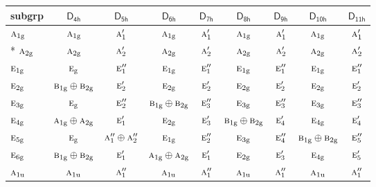 \documentclass[10pt,a4paper]{article}
\numberwithin{equation}{section}
\newcommand{\grp}[1]{\mathsf{#1}}
\newcommand{\irr}[1]{\text{\normalfont\scshape #1}}
\newcommand{\ptag}[1]{\mathrm{#1}}
\begin{document}
{\small\begin{longtable}{@{}lcccccccc@{}}\toprule
subgrp & \href{D4h.pdf}{$\grp{D_{4h}}$} & \href{D5h.pdf}{$\grp{D_{5h}}$} & \href{D6h.pdf}{$\grp{D_{6h}}$} & \href{D7h.pdf}{$\grp{D_{7h}}$} & \href{D8h.pdf}{$\grp{D_{8h}}$} & \href{D9h.pdf}{$\grp{D_{9h}}$} & \href{D10h.pdf}{$\grp{D_{10h}}$} & \href{D11h.pdf}{$\grp{D_{11h}}$}\\\midrule\endhead
\bottomrule\endfoot\endlastfoot
$\irr{a}_{1\ptag{g}}$ & $\irr{a}_{1\ptag{g}}$ & $\irr{a}_{1}'$ & $\irr{a}_{1\ptag{g}}$ & $\irr{a}_{1}'$ & $\irr{a}_{1\ptag{g}}$ & $\irr{a}_{1}'$ & $\irr{a}_{1\ptag{g}}$ & $\irr{a}_{1}'$\\*
$\irr{a}_{2\ptag{g}}$ & $\irr{a}_{2\ptag{g}}$ & $\irr{a}_{2}'$ & $\irr{a}_{2\ptag{g}}$ & $\irr{a}_{2}'$ & $\irr{a}_{2\ptag{g}}$ & $\irr{a}_{2}'$ & $\irr{a}_{2\ptag{g}}$ & $\irr{a}_{2}'$\\
$\irr{e}_{1\ptag{g}}$ & $\irr{e}_{\ptag{g}}$ & $\irr{e}_{1}''$ & $\irr{e}_{1\ptag{g}}$ & $\irr{e}_{1}''$ & $\irr{e}_{1\ptag{g}}$ & $\irr{e}_{1}''$ & $\irr{e}_{1\ptag{g}}$ & $\irr{e}_{1}''$\\
$\irr{e}_{2\ptag{g}}$ & $\irr{b}_{1\ptag{g}}\oplus \irr{b}_{2\ptag{g}}$ & $\irr{e}_{2}'$ & $\irr{e}_{2\ptag{g}}$ & $\irr{e}_{2}'$ & $\irr{e}_{2\ptag{g}}$ & $\irr{e}_{2}'$ & $\irr{e}_{2\ptag{g}}$ & $\irr{e}_{2}'$\\
$\irr{e}_{3\ptag{g}}$ & $\irr{e}_{\ptag{g}}$ & $\irr{e}_{2}''$ & $\irr{b}_{1\ptag{g}}\oplus \irr{b}_{2\ptag{g}}$ & $\irr{e}_{3}''$ & $\irr{e}_{3\ptag{g}}$ & $\irr{e}_{3}''$ & $\irr{e}_{3\ptag{g}}$ & $\irr{e}_{3}''$\\
$\irr{e}_{4\ptag{g}}$ & $\irr{a}_{1\ptag{g}}\oplus \irr{a}_{2\ptag{g}}$ & $\irr{e}_{1}'$ & $\irr{e}_{2\ptag{g}}$ & $\irr{e}_{3}'$ & $\irr{b}_{1\ptag{g}}\oplus \irr{b}_{2\ptag{g}}$ & $\irr{e}_{4}'$ & $\irr{e}_{4\ptag{g}}$ & $\irr{e}_{4}'$\\
$\irr{e}_{5\ptag{g}}$ & $\irr{e}_{\ptag{g}}$ & $\irr{a}_{1}''\oplus \irr{a}_{2}''$ & $\irr{e}_{1\ptag{g}}$ & $\irr{e}_{2}''$ & $\irr{e}_{3\ptag{g}}$ & $\irr{e}_{4}''$ & $\irr{b}_{1\ptag{g}}\oplus \irr{b}_{2\ptag{g}}$ & $\irr{e}_{5}''$\\
$\irr{e}_{6\ptag{g}}$ & $\irr{b}_{1\ptag{g}}\oplus \irr{b}_{2\ptag{g}}$ & $\irr{e}_{1}'$ & $\irr{a}_{1\ptag{g}}\oplus \irr{a}_{2\ptag{g}}$ & $\irr{e}_{1}'$ & $\irr{e}_{2\ptag{g}}$ & $\irr{e}_{3}'$ & $\irr{e}_{4\ptag{g}}$ & $\irr{e}_{5}'$\\
$\irr{a}_{1\ptag{u}}$ & $\irr{a}_{1\ptag{u}}$ & $\irr{a}_{1}''$ & $\irr{a}_{1\ptag{u}}$ & $\irr{a}_{1}''$ & $\irr{a}_{1\ptag{u}}$ & $\irr{a}_{1}''$ & $\irr{a}_{1\ptag{u}}$ & $\irr{a}_{1}''$\\

\end{longtable}}
\end{document}
